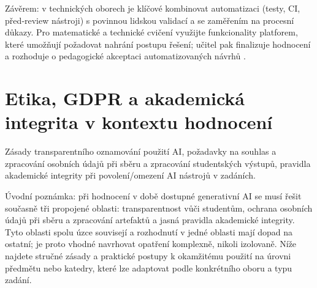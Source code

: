\documentclass{report}%
\begin{document}
Závěrem: v technických oborech je klíčové kombinovat automatizaci (testy, CI, před‑review nástroji) s povinnou lidskou validací a se zaměřením na procesní důkazy. Pro matematické a technické cvičení využijte funkcionality platforem, které umožňují požadovat nahrání postupu řešení; učitel pak finalizuje hodnocení a rozhoduje o pedagogické akceptaci automatizovaných návrhů \cite{kb_ai_101_tipu_pdf_04e4a115_page_8_1, kb_ai_101_tipu_pdf_04e4a115_page_54_1}.%

%
\section{Etika, GDPR a akademická integrita v kontextu hodnocení}%
Zásady transparentního oznamování použití AI, požadavky na souhlas a zpracování osobních údajů při sběru a zpracování studentských výstupů, pravidla akademické integrity při povolení/omezení AI nástrojů v zadáních.%


%
Úvodní poznámka: při hodnocení v době dostupné generativní AI se musí řešit současně tři propojené oblasti: transparentnost vůči studentům, ochrana osobních údajů při sběru a zpracování artefaktů a jasná pravidla akademické integrity. Tyto oblasti spolu úzce souvisejí a rozhodnutí v jedné oblasti mají dopad na ostatní; je proto vhodné navrhovat opatření komplexně, nikoli izolovaně. Níže najdete stručné zásady a praktické postupy k okamžitému použití na úrovni předmětu nebo katedry, které lze adaptovat podle konkrétního oboru a typu zadání.
\end{document}
